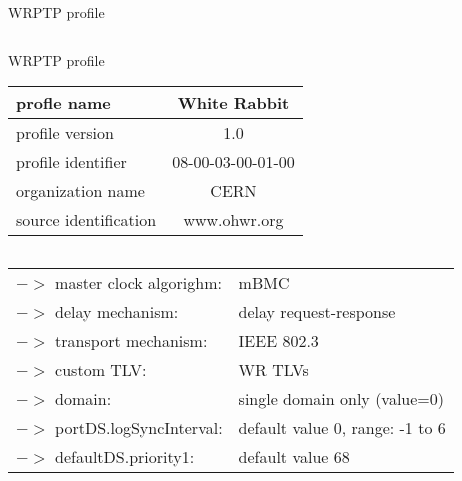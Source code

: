 \documentclass[compress,red]{beamer}
\begin{document}
\begin{frame}{WRPTP profile}


\begin{columns}[c]


  \begin{block}{\center WRPTP profile} 
    \small 
	\begin{tabular}{| l | c |}          	     \hline
	  profle name           &  White Rabbit      \\ \hline
	  profile version       &  1.0               \\ \hline
	  profile identifier    &  08-00-03-00-01-00 \\ \hline
	  organization name     &  CERN              \\ \hline
	  source identification &  www.ohwr.org	  \\ \hline
	\end{tabular}
    \end{block}
\end{columns}
  \vspace{0.5cm}
	\begin{tabular}{ l  l }          	     
		$->$ master clock algorighm:  & mBMC \\
		$->$ delay mechanism:         & delay request-response \\
		$->$ transport mechanism:     & IEEE 802.3 \\
		$->$ custom TLV:              & WR TLVs \\
		$->$ domain:                  & single domain only (value=0) \\
		$->$ portDS.logSyncInterval:  & default value 0, range: -1 to 6 \\
		$->$ defaultDS.priority1:     & default value 68 \\
	\end{tabular}


\end{frame}
\end{document}
